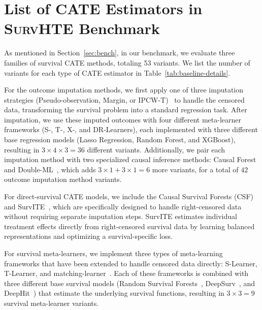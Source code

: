 \documentclass{article} %
\begin{document}

\clearpage

\section{List of CATE Estimators in \textsc{SurvHTE} Benchmark} \label{app:exp-setup}


As mentioned in Section~\ref{sec:bench}, in our benchmark, we evaluate three families of survival CATE methods, totaling 53 variants. We list the number of variants for each type of CATE estimator in Table~\ref{tab:baseline-details}.

For the outcome imputation methods, we first apply one of three imputation strategies (Pseudo-observation, Margin, or IPCW-T)~\citep{qi2023an} to handle the censored data, transforming the survival problem into a standard regression task. After imputation, we use these imputed outcomes with four different meta-learner frameworks (S-, T-, X-, and DR-Learners), each implemented with three different base regression models (Lasso Regression, Random Forest, and XGBoost), resulting in $3 \times 4 \times 3 = 36$
different variants. Additionally, we pair each imputation method with two specialized causal inference methods: Causal Forest~\citep{athey2019grf} and Double-ML~\citep{chernozhukov2018double}, which adds $3 \times 1 + 3 \times 1 = 6$ more variants, for a total of $42$ outcome imputation method variants.

For direct-survival CATE models, we include the Causal Survival Forests (CSF)~\citep{cui2023estimating} and SurvITE~\citep{curth2021survite}, which are specifically designed to handle right-censored data without requiring separate imputation steps. SurvITE estimates individual treatment effects directly from right-censored survival data by learning balanced representations and optimizing a survival-specific loss.

For survival meta-learners, we implement three types of meta-learning frameworks that have been extended to handle censored data directly: S-Learner, T-Learner, and matching-learner~\citep{noroozizadeh2025impact}. Each of these frameworks is combined with three different base survival models (Random Survival Forests~\citep{ishwaran2008random}, DeepSurv~\citep{katzman2018deepsurv}, and DeepHit~\citep{lee2018deephit}) that estimate the underlying survival functions, resulting in $3 \times 3 = 9$ survival meta-learner variants.
\end{document}

